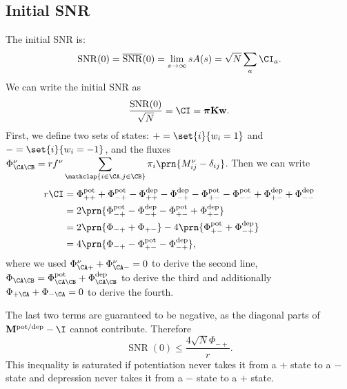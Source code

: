 \documentclass[12pt]{article}
\newcommand{\eqm}{\pi}
\newcommand{\eq}{\boldsymbol{\eqm}}
\newcommand{\wm}{w}
\newcommand{\w}{\mathbf{\wm}}
\newcommand{\MMdm}{M}
\newcommand{\MMd}{\mathbf{\MMdm}}
\newcommand{\encm}{K}
\newcommand{\enc}{\mathbf{\encm}}
\newcommand{\Fm}{\Phi}
\newcommand{\pot}{^{\text{pot}}}
\newcommand{\dep}{^{\text{dep}}}
\newcommand{\potdep}{^{\text{pot/dep}}}
\DeclareMathOperator{\SNR}{SNR}
\DeclareMathOperator{\snr}{SNR}
\newcommand{\snrb}{\overline{\snr}}
\begin{document}
\subsection{Initial SNR}\label{sec:initial}

The initial SNR is:
%
\begin{equation}\label{eq:initdef}
  \snr(0) = \snrb(0) = \lim_{s\to\infty} sA(s)
      = \sqrt{N} \sum_a \CI_a.
\end{equation}
%
We can write the initial SNR as
%
\begin{equation*}
  \frac{\SNR(0)}{\sqrt{N}} = \CI = \eq \enc \w.
\end{equation*}
%
First, we define two sets of states: \( + = \set{i}{\wm_i = 1} \) and \( - = \set{i}{\wm_i = - 1} \), and the fluxes \( \Fm^\nu_{\CA \CB} = r f^\nu \displaystyle\sum_{\mathclap{i \in \CA, j \in \CB}} \eqm_i \prn{\MMdm^\nu_{ij} - \delta_{ij}} \).
Then we can write
%
\begin{equation*}
\begin{aligned}
  r\CI &= \Fm\pot_{++} + \Fm\pot_{-+} - \Fm\dep_{++} - \Fm\dep_{-+} - \Fm\pot_{+-} - \Fm\pot_{--} + \Fm\dep_{+-} + \Fm\dep_{--} \\
      &= 2\prn{\Fm\pot_{-+} - \Fm\dep_{-+} - \Fm\pot_{+-} + \Fm\dep_{+-}} \\
      &= 2\prn{\Fm_{-+} + \Fm_{+-}} - 4\prn{\Fm\pot_{+-} + \Fm\dep_{-+}} \\
      &= 4\prn{\Fm_{-+} - \Fm\pot_{+-} - \Fm\dep_{-+}}, \\
\end{aligned}
\end{equation*}
%
where we used \( \Fm^\nu_{\CA+} + \Fm^\nu_{\CA-} = 0 \) to derive the second line, \( \Fm_{\CA\CB} = \Fm\pot_{\CA\CB} + \Fm\dep_{\CA\CB} \) to derive the third and additionally \( \Fm_{+\CA} + \Fm_{-\CA} = 0 \) to derive the fourth.

The last two terms are guaranteed to be negative, as the diagonal parts of \(\MMd \potdep - \I\) cannot contribute.
Therefore
%
\begin{equation}\label{eq:initfluxineq}
  \SNR(0) \leq \frac{4\sqrt{N}\Fm_{-+}}{r}.
\end{equation}
%
This inequality is saturated if potentiation never takes it from a \(+\) state to a \(-\) state and depression never takes it from a \(-\) state to a \(+\) state.
\end{document}
